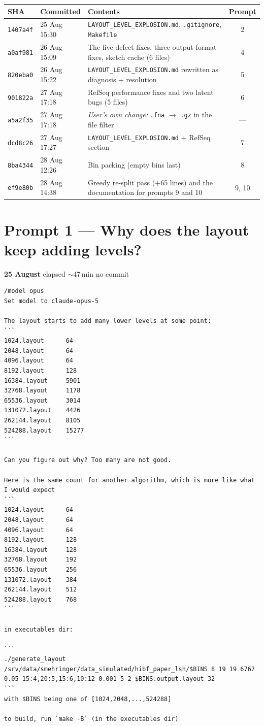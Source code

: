 \documentclass[11pt,a4paper]{article}
\newenvironment{promptbox}{\medskip}{\medskip}
\newcommand{\sha}[1]{\texttt{#1}}
\begin{document}
\begin{longtable}{@{}llp{8.2cm}c@{}}
\toprule
\textbf{SHA} & \textbf{Committed} & \textbf{Contents} & \textbf{Prompt} \\
\midrule
\endhead
\sha{1407a4f} & 25 Aug 15:30 & \texttt{LAYOUT\_LEVEL\_EXPLOSION.md}, \texttt{.gitignore},
  \texttt{Makefile} & 2 \\
\sha{a0af981} & 26 Aug 15:09 & The five defect fixes, three output-format fixes, sketch cache
  (6 files) & 4 \\
\sha{820eba0} & 26 Aug 15:22 & \texttt{LAYOUT\_LEVEL\_EXPLOSION.md} rewritten as
  diagnosis + resolution & 5 \\
\sha{901822a} & 27 Aug 17:18 & RefSeq performance fixes and two latent bugs (5 files) & 6 \\
\sha{a5a2f35} & 27 Aug 17:18 & \emph{User's own change:} \texttt{.fna} $\rightarrow$ \texttt{.gz}
  in the file filter & --- \\
\sha{dcd8c26} & 27 Aug 17:27 & \texttt{LAYOUT\_LEVEL\_EXPLOSION.md} + RefSeq section & 7 \\
\sha{8ba4344} & 28 Aug 12:26 & Bin packing (empty bins last) & 8 \\
\sha{ef9e80b} & 28 Aug 14:38 & Greedy re-split pass (+65 lines) and the documentation for
  prompts 9 and 10 & 9, 10 \\
\bottomrule
\end{longtable}

\newpage

\section{Prompt 1 --- Why does the layout keep adding levels?}
\textbf{25 August} \textperiodcentered{} elapsed ${\sim}$47\,min \textperiodcentered{} no commit
\begin{promptbox}
\begin{lstlisting}[style=promptstyle]
/model opus
Set model to claude-opus-5

The layout starts to add many lower levels at some point:
```
1024.layout      64
2048.layout      64
4096.layout      64
8192.layout      128
16384.layout     5901
32768.layout     1178
65536.layout     3014
131072.layout    4426
262144.layout    8105
524288.layout    15277
```

Can you figure out why? Too many are not good.

Here is the same count for another algorithm, which is more like what I would expect
```
1024.layout      64
2048.layout      64
4096.layout      64
8192.layout      128
16384.layout     128
32768.layout     192
65536.layout     256
131072.layout    384
262144.layout    512
524288.layout    768
```

in executables dir:

```
./generate_layout /srv/data/smehringer/data_simulated/hibf_paper_lsh/$BINS 8 19 19 6767 0.05 15:4,20:5,15:6,10:12 0.001 5 2 $BINS.output.layout 32
```
with $BINS being one of [1024,2048,...,524288]

to build, run `make -B` (in the executables dir)
\end{lstlisting}
\end{promptbox}
\end{document}
